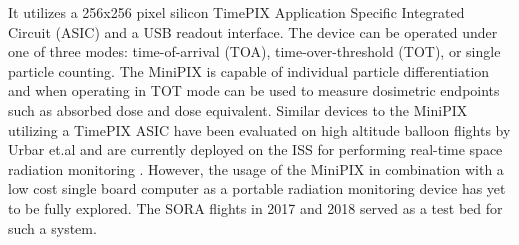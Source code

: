 It utilizes a 256x256 pixel silicon TimePIX Application Specific Integrated Circuit (ASIC) and a USB readout interface. The device can be operated under one of three modes: time-of-arrival (TOA), time-over-threshold (TOT), or single particle counting. 
%
%
%
The MiniPIX is capable of individual particle differentiation and when operating in TOT mode can be used to measure dosimetric endpoints such as absorbed dose and dose equivalent. Similar devices to the MiniPIX utilizing a TimePIX ASIC have been evaluated on high altitude balloon flights by Urbar et.al \cite{bexus} and are currently deployed on the ISS for performing real-time space radiation monitoring \cite{timepixiss}. However, the usage of the MiniPIX in combination with a low cost single board computer as a portable radiation monitoring device has yet to be fully explored. The SORA flights in 2017 and 2018 served as a test bed for such a system.

